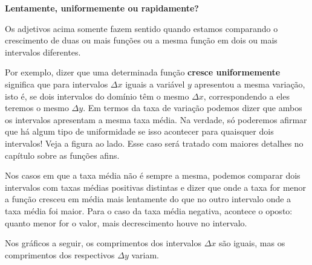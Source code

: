 \textbf{Lentamente, uniformemente ou rapidamente?}

\begin{figure}
\centering
\vspace{-1em}
\end{figure}
Os adjetivos acima somente fazem sentido quando estamos comparando o crescimento de duas ou mais funções ou a mesma função em dois ou mais intervalos diferentes. 

Por exemplo, dizer que uma determinada função \textbf{cresce uniformemente} significa que para intervalos $\Delta x$ iguais a variável $y$ apresentou a mesma variação, isto é, se dois intervalos do domínio têm o mesmo $\Delta x$, correspondendo a eles teremos o mesmo $\Delta y$. Em termos da taxa de variação podemos dizer que ambos os intervalos apresentam a mesma taxa média. Na verdade, só poderemos afirmar que há algum tipo de uniformidade se isso acontecer para quaisquer dois intervalos! Veja a figura ao lado. Esse caso será tratado com maiores detalhes no capítulo sobre as funções afins.\par

Nos casos em que a taxa média não é sempre a mesma, podemos comparar dois intervalos com taxas médias positivas distintas e dizer que onde a taxa for menor a função cresceu em média mais lentamente do que no outro intervalo onde a taxa média foi maior. Para o caso da taxa média negativa, acontece o oposto: quanto menor for o valor, mais decrescimento houve no intervalo.

Nos gráficos a seguir, os comprimentos dos intervalos $\Delta x$ são iguais, mas os comprimentos dos respectivos $\Delta y$ variam.

